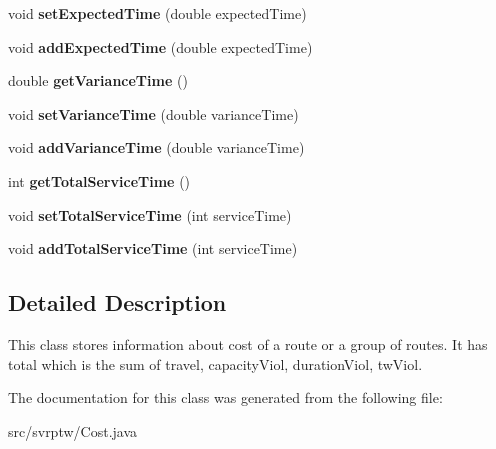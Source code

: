 \begin{DoxyCompactItemize}
\item 
void {\bfseries set\+Expected\+Time} (double expected\+Time)\hypertarget{classsvrptw_1_1_cost_a56f942d7a330ca94a78e2d0d76ba8e65}{}\label{classsvrptw_1_1_cost_a56f942d7a330ca94a78e2d0d76ba8e65}

\item 
void {\bfseries add\+Expected\+Time} (double expected\+Time)\hypertarget{classsvrptw_1_1_cost_a0c717de32dfad053bfcf12264370ed8b}{}\label{classsvrptw_1_1_cost_a0c717de32dfad053bfcf12264370ed8b}

\item 
double {\bfseries get\+Variance\+Time} ()\hypertarget{classsvrptw_1_1_cost_aeca7812b85ee741f6b8ac071c1729afb}{}\label{classsvrptw_1_1_cost_aeca7812b85ee741f6b8ac071c1729afb}

\item 
void {\bfseries set\+Variance\+Time} (double variance\+Time)\hypertarget{classsvrptw_1_1_cost_aaf8dcd75ba6b32c4e88b7e5b453e8c1f}{}\label{classsvrptw_1_1_cost_aaf8dcd75ba6b32c4e88b7e5b453e8c1f}

\item 
void {\bfseries add\+Variance\+Time} (double variance\+Time)\hypertarget{classsvrptw_1_1_cost_af5f5efe59dd7a1c47aa9bde667f86cbd}{}\label{classsvrptw_1_1_cost_af5f5efe59dd7a1c47aa9bde667f86cbd}

\item 
int {\bfseries get\+Total\+Service\+Time} ()\hypertarget{classsvrptw_1_1_cost_a46ecdd8edfe3cdadcc3eabf7a07cb046}{}\label{classsvrptw_1_1_cost_a46ecdd8edfe3cdadcc3eabf7a07cb046}

\item 
void {\bfseries set\+Total\+Service\+Time} (int service\+Time)\hypertarget{classsvrptw_1_1_cost_ae984703e379c4e803fb26a1bd0217c8b}{}\label{classsvrptw_1_1_cost_ae984703e379c4e803fb26a1bd0217c8b}

\item 
void {\bfseries add\+Total\+Service\+Time} (int service\+Time)\hypertarget{classsvrptw_1_1_cost_a9d5c85ec07435deb7b75eb58f12d55ae}{}\label{classsvrptw_1_1_cost_a9d5c85ec07435deb7b75eb58f12d55ae}

\end{DoxyCompactItemize}


\subsection{Detailed Description}
This class stores information about cost of a route or a group of routes. It has total which is the sum of travel, capacity\+Viol, duration\+Viol, tw\+Viol. 

The documentation for this class was generated from the following file\+:\begin{DoxyCompactItemize}
\item 
src/svrptw/Cost.\+java\end{DoxyCompactItemize}
